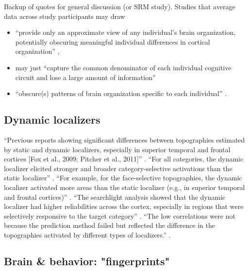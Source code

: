 Backup of quotes for general discussion (or SRM study).  Studies that average
data across study participants may draw

\begin{itemize}

\item ``provide only an approximate view of any individual's brain organization,
    potentially obscuring meaningful individual differences in cortical
        organization'' \citep{laumann2015functional},

\item may just ``capture the common denominator of each individual cognitive
    circuit and lose a large amount of information''

\item ``obscure(s) patterns of brain organization specific to each individual''
    \citep{laumann2015functional}.

\end{itemize}


\subsection{Dynamic localizers}
%
``Previous reports showing significant differences between topographies
estimated by static and dynamic localizers, especially in superior temporal and
frontal cortices [Fox et al., 2009; Pitcher et al., 2011]''
\citep{jiahui2022cross}.
%
``For all categories, the dynamic localizer elicited stronger and broader
category-selective activations than the static localizer''
\citep{jiahui2022cross}.
%
``For example, for the face-selective topographies, the dynamic localizer
activated more areas than the static localizer (e.g., in superior temporal and
frontal cortices)'' \citep{jiahui2022cross}.
%
``The searchlight analysis showed that the dynamic localizer had higher
reliabilities across the cortex, especially in regions that were selectively
responsive to the target category'' \citep{jiahui2022cross}.
%
``The low correlations were not because the prediction method failed but
reflected the difference in the topographies activated by different types of
localizers.'' \citep{jiahui2022cross}.


\subsection{Brain \& behavior: "fingerprints"}


